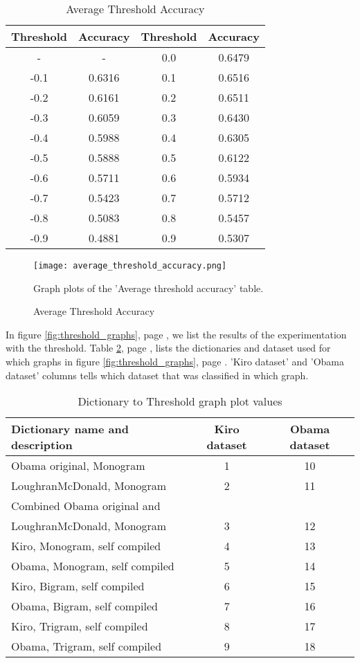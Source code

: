 \begin{table}
\centering
\label{tbl:average_threshold_accuracy}
\caption{Average Threshold Accuracy}
\begin{tabular}{ c c c c }
Threshold & Accuracy & Threshold & Accuracy \\
\hline
- & - & 0.0 & 0.6479 \\
-0.1 & 0.6316 & 0.1 & 0.6516 \\
-0.2 & 0.6161 & 0.2 & 0.6511 \\
-0.3 & 0.6059 & 0.3 & 0.6430 \\
-0.4 & 0.5988 & 0.4 & 0.6305 \\
-0.5 & 0.5888 & 0.5 & 0.6122 \\
-0.6 & 0.5711 & 0.6 & 0.5934 \\
-0.7 & 0.5423 & 0.7 & 0.5712 \\
-0.8 & 0.5083 & 0.8 & 0.5457 \\
-0.9 & 0.4881 & 0.9 & 0.5307 \\
\end{tabular}
\end{table}

\begin{figure}[htb]
    \centering
    \texttt{[image: average\_threshold\_accuracy.png]}
    \label{fig:average_threshold_accuracy}
    \caption{Average Threshold Accuracy}
Graph plots of the 'Average threshold accuracy' table.
\end{figure}

In figure \ref{fig:threshold_graphs}, page \pageref{fig:threshold_graphs}, we list the results of the experimentation
with the threshold. Table \ref{tbl:dictionary_to_threshold}, page
\pageref{tbl:dictionary_to_threshold}, lists the
dictionaries and dataset used for which graphs in figure
\ref{fig:threshold_graphs}, page \pageref{fig:threshold_graphs}.
'Kiro dataset' and 'Obama dataset' columns tells which dataset that was
classified in which graph.

\begin{table}
\centering
\label{tbl:dictionary_to_threshold}
\caption{Dictionary to Threshold graph plot values}
\begin{tabular}{ l c c }
Dictionary name and description & Kiro dataset & Obama dataset \\
\hline
Obama original, Monogram & 1 & 10 \\
LoughranMcDonald, Monogram & 2 & 11 \\
Combined Obama original and \\ LoughranMcDonald, Monogram & 3 & 12 \\
Kiro, Monogram, self compiled & 4 & 13 \\
Obama, Monogram, self compiled & 5 & 14 \\
Kiro, Bigram, self compiled & 6 & 15 \\
Obama, Bigram, self compiled & 7 & 16 \\
Kiro, Trigram, self compiled & 8 & 17 \\
Obama, Trigram, self compiled & 9 & 18 \\
\end{tabular}
\end{table}


